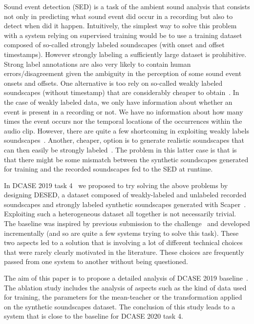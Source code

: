 \documentclass{article}
\begin{document}
\begin{sloppy}
Sound event detection (SED) is a task of the ambient sound analysis that consists not only in predicting what sound event did occur in a recording but also to detect when did it happen. Intuitively, the simplest way to solve this problem with a system relying on supervised training would be to use a training dataset composed of so-called strongly labeled soundscapes (with onset and offset timestamps). However strongly labeling a sufficiently large dataset is prohibitive. Strong label annotations are also very likely to contain human errors/disagreement given the ambiguity in the perception of some sound event onsets and offsets. One alternative is too rely on so-called weakly labeled soundscapes (without timestamp) that are considerably cheaper to obtain~\cite{serizel2018_DCASE}. In the case of weakly labeled data, we only have information about whether an event is present in a recording or not. We have no information about how many times the event occurs nor the temporal locations of the occurrences within the audio clip. However, there are quite a few shortcoming in exploiting weakly labels soundscapes~\cite{shah_closer_2018,turpault:hal-02467401,McFee:AutoPool:TASLP:18}. Another, cheaper, option is to generate realistic soundscapes that can then easily be strongly labeled~\cite{salamon2017scaper}. The problem in this latter case is that is that there might be some mismatch between the synthetic soundscapes generated for training and the recorded soundscapes fed to the SED at runtime.

In DCASE 2019 task 4~\cite{turpault_2019} we proposed to try solving the above problems by designing DESED, a dataset composed of weakly-labeled and unlabeled recorded soundscapes and strongly labeled synthetic soundscapes generated with Scaper~\cite{salamon2017scaper}. Exploiting such a heterogeneous dataset all together is not necessarily trivial. The baseline was inspired by previous submission to the challenge~\cite{Lu2018,Delphin-Poulat2019} and developed incrementally (and so are quite a few systems trying to solve this task). These two aspects led to a solution that is involving a lot of different technical choices that were rarely clearly motivated in the literature. These choices are frequently passed from one system to another without being questioned.

The aim of this paper is to propose a detailed analysis of DCASE 2019 baseline~\cite{turpault_2019}. The ablation study includes the analysis of aspects such as the kind of data used for training, the parameters for the mean-teacher or the transformation applied on the synthetic soundscapes dataset. The conclusion of this study leads to a system that is close to the baseline for DCASE 2020 task 4.

\end{sloppy}
\end{document}

